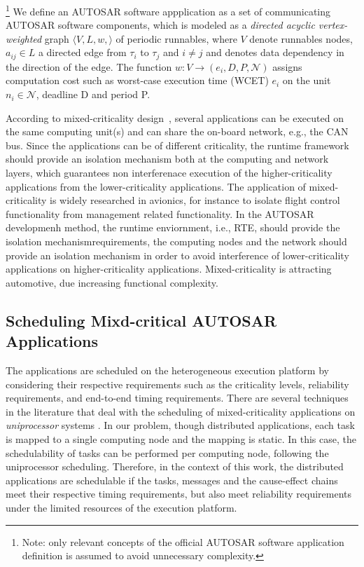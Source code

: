 \begin{definition}\footnote{ Note: only relevant concepts of the official AUTOSAR software application definition is assumed to avoid unnecessary complexity. }\label{def_application}
We define an AUTOSAR software appplication as a set of communicating AUTOSAR software components, which is modeled as a \textit{directed acyclic vertex-weighted} graph $\langle V, L, w, \rangle$ of periodic runnables, where $V$ denote runnables nodes, $a_{ij}\in L$ a directed edge from $\tau_i$ to $\tau_j$ and $i \neq j$ and denotes data dependency in the direction of the edge. The function $w: V\rightarrow (e_i,D,P, \mathcal{N})$ assigns computation cost such as worst-case execution time (WCET) $e_i$ on the unit $n_i\in \mathcal{N}$, deadline D and period P.
\end{definition}

According to mixed-criticality design~\cite{Vestal2007PreemptiveAssurance}, several applications can be executed on the same computing unit(s) and can share the on-board network, e.g., the CAN bus. Since the applications can be of different criticality, the runtime framework should provide an isolation mechanism both at the computing and network layers,  which guarantees non interferenace execution of the higher-criticality applications from the lower-criticality applications. The application of mixed-criticality is widely researched in avionics, for instance to isolate flight control functionality from management related functionality. In the AUTOSAR developmenh method, the runtime enviornment, i.e., RTE, should provide the isolation mechanismrequirements, the computing nodes and the network should provide an isolation mechanism in order to avoid interference of lower-criticality applications on higher-criticality applications. Mixed-criticality is attracting automotive, due increasing functional complexity. 

\subsection{Scheduling Mixd-critical AUTOSAR Applications}
The applications are scheduled on the heterogeneous execution platform by considering their respective requirements such as the criticality levels, reliability requirements, and end-to-end timing requirements. There are several techniques in the literature that deal with the scheduling of mixed-criticality applications on \textit{uniprocessor} systems \cite{Vestal2007PreemptiveAssurance}. In our problem, though distributed applications, each task is mapped to a single computing node and the mapping is static. In this case, the schedulability of tasks can be performed per computing node, following the uniprocessor scheduling. Therefore, in the context of this work, the distributed applications are schedulable if the tasks, messages and the cause-effect chains meet their respective timing requirements, but also meet reliability requirements under the limited resources of the execution platform.

